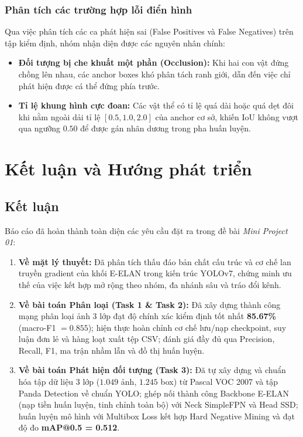 \documentclass[fontsize=13pt,a4paper,oneside,DIV=calc,chapterprefix=true]{scrbook}
\begin{document}
\subsection{Phân tích các trường hợp lỗi điển hình}
Qua việc phân tích các ca phát hiện sai (False Positives và False Negatives) trên tập kiểm định, nhóm nhận diện được các nguyên nhân chính:
\begin{itemize}[leftmargin=1.2cm]
    \item \textbf{Đối tượng bị che khuất một phần (Occlusion):} Khi hai con vật đứng chồng lên nhau, các anchor boxes khó phân tách ranh giới, dẫn đến việc chỉ phát hiện được cá thể đứng phía trước.
    \item \textbf{Tỉ lệ khung hình cực đoan:} Các vật thể có tỉ lệ quá dài hoặc quá dẹt đôi khi nằm ngoài dải tỉ lệ $[0.5, 1.0, 2.0]$ của anchor cơ sở, khiến IoU không vượt qua ngưỡng $0.50$ để được gán nhãn dương trong pha huấn luyện.
\end{itemize}

\chapter{Kết luận và Hướng phát triển}
\label{chap:concl}

\section{Kết luận}
Báo cáo đã hoàn thành toàn diện các yêu cầu đặt ra trong đề bài \textit{Mini Project 01}:
\begin{enumerate}[leftmargin=1.2cm]
    \item \textbf{Về mặt lý thuyết:} Đã phân tích thấu đáo bản chất cấu trúc và cơ chế lan truyền gradient của khối E-ELAN trong kiến trúc YOLOv7, chứng minh ưu thế của việc kết hợp mở rộng theo nhóm, đa nhánh sâu và tráo đổi kênh.
    \item \textbf{Về bài toán Phân loại (Task 1 \& Task 2):} Đã xây dựng thành công mạng phân loại ảnh 3 lớp đạt độ chính xác kiểm định tốt nhất \textbf{85.67\%} (macro-F1 $=0.855$); hiện thực hoàn chỉnh cơ chế lưu/nạp checkpoint, suy luận đơn lẻ và hàng loạt xuất tệp CSV; đánh giá đầy đủ qua Precision, Recall, F1, ma trận nhầm lẫn và đồ thị huấn luyện.
    \item \textbf{Về bài toán Phát hiện đối tượng (Task 3):} Đã tự xây dựng và chuẩn hóa tập dữ liệu 3 lớp ($1.049$ ảnh, $1.245$ box) từ Pascal VOC 2007 và tập Panda Detection về chuẩn YOLO; ghép nối thành công Backbone E-ELAN (nạp tiền huấn luyện, tinh chỉnh toàn bộ) với Neck SimpleFPN và Head SSD; huấn luyện mô hình với Multibox Loss kết hợp Hard Negative Mining và đạt độ đo \textbf{mAP@0.5 = 0.512}.
\end{enumerate}
\end{document}
